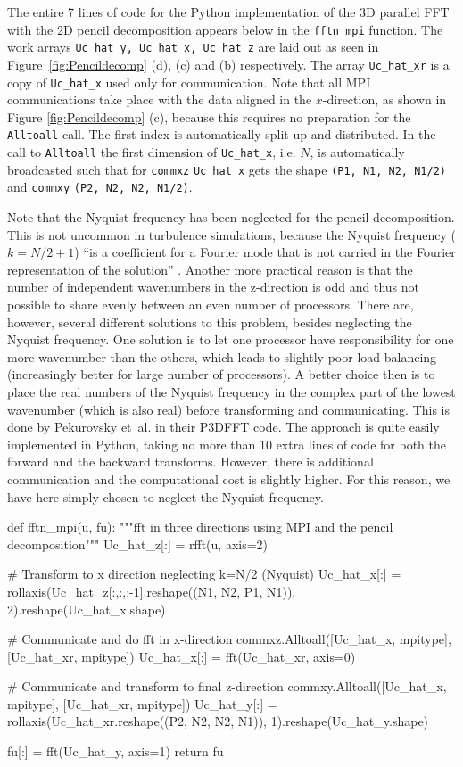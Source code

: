 \documentclass[11pt, oneside]{article}
\newcommand{\inpyth}{\lstinline[keywordstyle={}, basicstyle=\ttfamily]} %[]%
\begin{document}
The entire 7 lines of code for the Python implementation of the 3D parallel FFT with the 2D pencil
decomposition appears below in the \inpyth{fftn_mpi} function. The work arrays \inpyth{Uc_hat_y, Uc_hat_x, Uc_hat_z} are laid out as seen in Figure~\ref{fig:Pencildecomp} (d), (c) and (b) respectively. The array
\inpyth{Uc_hat_xr} is a copy of \inpyth{Uc_hat_x} used only for communication. Note that all MPI
communications take place with the data aligned in the $x$-direction, as shown in Figure
\ref{fig:Pencildecomp} (c), because this requires no preparation for the \inpyth{Alltoall} call. The first
index is automatically split up and distributed.  In the call to \inpyth{Alltoall} the first dimension of
\inpyth{Uc_hat_x}, i.e. $N$, is automatically broadcasted such that for \inpyth{commxz} \inpyth{Uc_hat_x}
gets the shape \inpyth{(P1, N1, N2, N1/2)} and \inpyth{commxy} \inpyth{(P2, N2, N2, N1/2)}.

Note that the Nyquist frequency has been neglected for the pencil decomposition. This is not uncommon in
turbulence simulations, because the Nyquist frequency ($k=N/2+1$) ``is a coefficient for a Fourier mode
that is not carried in the Fourier representation of the solution'' \cite{Lee2013}.  Another more practical
reason is that the number of independent wavenumbers in the z-direction is odd and thus not possible to share evenly
between an even number of processors. There are, however, several different solutions to this problem,
besides neglecting the Nyquist frequency. One solution is to let one processor have responsibility for one
more wavenumber than the others, which leads to slightly poor load balancing (increasingly better for large
number of processors). A better choice then is to place the real numbers of the Nyquist frequency in the
complex part of the lowest wavenumber (which is also real) before transforming and communicating. This is
done by Pekurovsky et~al. \cite{pekurovsky2012} in their P3DFFT code. The approach is quite easily
implemented in Python, taking no more than 10 extra lines of code for both the forward and the backward
transforms. However, there is additional communication and the computational cost is slightly higher. For
this reason, we have here simply chosen to neglect the Nyquist frequency.


\begin{python}
def fftn_mpi(u, fu):
    """fft in three directions using MPI and the pencil decomposition"""
    Uc_hat_z[:] = rfft(u, axis=2)

    # Transform to x direction neglecting k=N/2 (Nyquist)
    Uc_hat_x[:] = rollaxis(Uc_hat_z[:,:,:-1].reshape((N1, N2, P1, N1)),
                           2).reshape(Uc_hat_x.shape)

    # Communicate and do fft in x-direction
    commxz.Alltoall([Uc_hat_x, mpitype], [Uc_hat_xr, mpitype])
    Uc_hat_x[:] = fft(Uc_hat_xr, axis=0)

    # Communicate and transform to final z-direction
    commxy.Alltoall([Uc_hat_x, mpitype], [Uc_hat_xr, mpitype])
    Uc_hat_y[:] = rollaxis(Uc_hat_xr.reshape((P2, N2, N2, N1)),
                           1).reshape(Uc_hat_y.shape)

    fu[:] = fft(Uc_hat_y, axis=1)
    return fu
\end{python}
\end{document}
